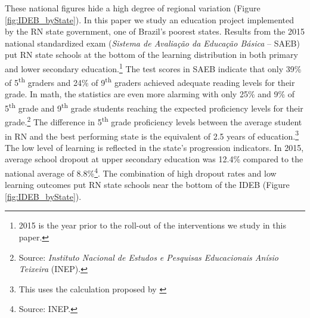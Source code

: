 \documentclass[11pt,a4paper]{article}
\begin{document}
These national figures hide a high degree of regional variation (Figure \ref{fig:IDEB_byState}). In this paper we study an education project implemented by the RN state government, one of Brazil's poorest states. Results from the 2015 national standardized exam (\textit{Sistema de Avaliação da Educação Básica} -- SAEB) put RN state schools at the bottom of the learning distribution in both primary and lower secondary education.\footnote{2015 is the year prior to the roll-out of the interventions we study in this paper.} The test scores in SAEB indicate that only 39\% of 5\textsuperscript{th} graders and 24\% of 9\textsuperscript{th} graders achieved adequate reading levels for their grade. In math, the statistics are even more alarming with only 25\% and 9\% of 5\textsuperscript{th} grade and 9\textsuperscript{th} grade students reaching the expected proficiency levels for their grade.\footnote{Source: \textit{Instituto Nacional de Estudos e Pesquisas Educacionais Anísio Teixeira} (INEP).} The difference in 5\textsuperscript{th} grade proficiency levels between the average student in RN and the best performing state is the equivalent of 2.5 years of education.\footnote{This uses the calculation proposed by \cite{alves2016desigualdades}} The low level of learning is reflected in the state's progression indicators. In 2015, average school dropout at upper secondary education was 12.4\% compared to the national average of 8.8\%\footnote{Source: INEP.}. The combination of high dropout rates and low learning outcomes put RN state schools near the bottom of the IDEB (Figure \ref{fig:IDEB_byState}).
\end{document}
